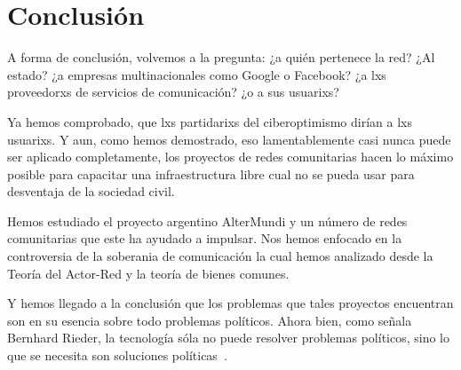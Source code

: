 \section{Conclusión}

A forma de conclusión, volvemos a la pregunta: ¿a quién pertenece la red?
¿Al estado? ¿a empresas multinacionales como Google o Facebook? ¿a lxs proveedorxs de servicios de comunicación? ¿o a sus usuarixs?

Ya hemos comprobado, que lxs partidarixs del ciberoptimismo dirían a lxs usuarixs.
Y aun, como hemos demostrado, eso lamentablemente casi nunca puede ser aplicado completamente, los proyectos de redes comunitarias hacen lo máximo posible para capacitar una infraestructura libre cual no se pueda usar para desventaja de la sociedad civil.

Hemos estudiado el proyecto argentino AlterMundi y un número de redes comunitarias que este ha ayudado a impulsar.
Nos hemos enfocado en la controversia de la soberania de comunicación la cual hemos analizado desde la Teoría del Actor-Red y la teoría de bienes comunes.

Y hemos llegado a la conclusión que los problemas que tales proyectos encuentran son en su esencia sobre todo problemas políticos.
Ahora bien, como señala Bernhard Rieder, la tecnología sóla no puede resolver problemas políticos, sino lo que se necesita son soluciones políticas~\autocite{Rieder2012}.

